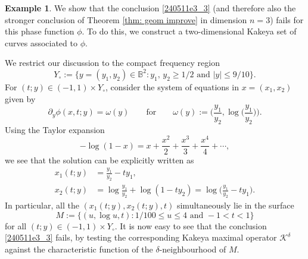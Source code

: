 \documentclass[reqno]{amsart}
\numberwithin{equation}{section}
\newcommand{\B}{\mathbb{B}}
\newcommand{\cK}{\mathcal{K}}
\theoremstyle{plain}
\theoremstyle{definition}
\newtheorem{example}[theorem]{Example}
\begin{document}
\begin{example}
We show that the conclusion \eqref{240511e3_3} (and therefore also the stronger conclusion of Theorem \ref{thm: geom improve} in dimension $n=3$) fails for this phase function $\phi$. To do this, we construct a two-dimensional Kakeya set of curves associated to $\phi$. 

We restrict our discussion to the compact frequency region 
\begin{equation*}
   Y_{\circ} := \big\{
    y = (y_1, y_2) \in \B^2: y_1, \, y_2 \geq 1/2 \textrm{ and } |y| \leq 9/10 
    \big\}.
\end{equation*}
For $(t;y) \in (-1,1) \times Y_{\circ}$, consider the system of equations in $x = (x_1, x_2)$ given by
\begin{equation*}
  \partial_y\phi(x, t; y)=\omega(y) \qquad \textrm{for} \qquad  \omega(y):= \Big( 
\frac{y_1}{y_2},
\log \Big(\frac{y_1}{y_2}\Big)\Big).
\end{equation*}
Using the Taylor expansion 
\begin{equation*}
-\log (1-x)=x+\frac{x^2}{2}+\frac{x^3}{3}+\frac{x^4}{4}+\cdots,
\end{equation*}
we see that the solution can be explicitly written as
\begin{align*}
x_1(t; y)&=\frac{y_1}{y_2}-ty_1,\\
x_2(t; y)
&=\log \frac{y_1}{y_2}+\log (1-ty_2)=
\log \Big(
\frac{y_1}{y_2}-ty_1
\Big).
\end{align*}
In particular, all the $(x_1(t;y),x_2(t;y),t)$ simultaneously lie in the surface
\begin{equation*}
    M := \big\{ (u, \log u, t) : 1/100\leq u\leq 4 \textrm{ and } -1 < t < 1 \}
\end{equation*}
for all $(t; y) \in (-1,1) \times Y_{\circ}$. It is now easy to see that the conclusion \eqref{240511e3_3} fails, by testing the corresponding Kakeya maximal operator $\cK^{\delta}$ against the characteristic function of the $\delta$-neighbourhood of $M$.\medskip


\end{example}
\end{document}

